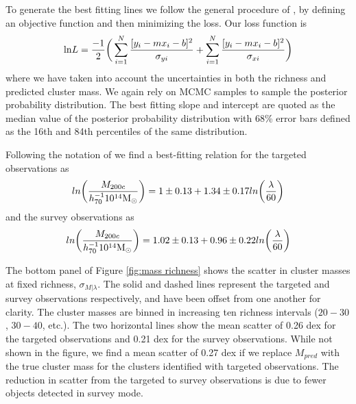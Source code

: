 \documentclass[fleqn,usenatbib]{mnras}
\begin{document}
To generate the best fitting lines we follow the general procedure of \cite{Hogg2010}, by defining an objective function and then minimizing the loss. Our loss function is
\begin{equation}
	\mathrm{ln}L= \frac{-1}{2} \bigg{(} \sum^N_{i=1}\frac{[y_i - mx_i - b]^2}{\sigma_{yi}} + \sum^N_{i=1}\frac{[y_i - mx_i - b]^2}{\sigma_{xi}} \bigg{)}
\end{equation} 
where we have taken into account the uncertainties in both the richness and predicted cluster mass. We again rely on MCMC samples to sample the posterior probability distribution. The best fitting slope and intercept are quoted as the median value of the posterior probability distribution with 68\% error bars defined as the 16th and 84th percentiles of the same distribution.

Following the notation of \cite{Rykoff2012} we find a best-fitting relation for the targeted observations as
\begin{equation}
	ln\bigg{(}\frac{M_{200c}}{h_{70}^{-1} 10^{14}\hbox{$\mathrm{M}_\odot$}}\bigg{)} = 1\pm0.13 + 1.34\pm0.17 ln\bigg{(}\frac{\lambda}{60}\bigg{)} \nonumber
\end{equation}
and the survey observations as
\begin{equation}
	ln\bigg{(}\frac{M_{200c}}{h_{70}^{-1} 10^{14}\hbox{$\mathrm{M}_\odot$}}\bigg{)} = 1.02\pm0.13 + 0.96\pm0.22 ln\bigg{(}\frac{\lambda}{60}\bigg{)} \nonumber
\end{equation}

The bottom panel of Figure \ref{fig:mass richness} shows the scatter in cluster masses at fixed richness, $\sigma_{M|\lambda}$. The solid and dashed lines represent the targeted and survey observations respectively, and have been offset from one another for clarity. The cluster masses are binned in increasing ten richness intervals ($20-30$, $30-40$, etc.). The two horizontal lines show the mean scatter of 0.26 dex for the targeted observations and 0.21 dex for the survey observations. While not shown in the figure, we find a mean scatter of 0.27 dex if we replace $M_{pred}$ with the true cluster mass for the clusters identified with targeted observations. The reduction in scatter from the targeted to survey observations is due to fewer objects detected in survey mode.

	
\end{document}
